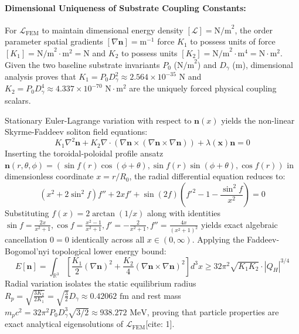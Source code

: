 \documentclass[11pt,a4paper]{article}
\begin{document}
	\paragraph{Dimensional Uniqueness of Substrate Coupling Constants:}
	For $\mathcal{L}_{\text{FEM}}$ to maintain dimensional energy density $[\mathcal{L}] = \text{N/m}^2$, the order parameter spatial gradients $[\nabla \mathbf{n}] = \text{m}^{-1}$ force $K_1$ to possess units of force $[K_1] = \text{N/m}^2 \cdot \text{m}^2 = \text{N}$ and $K_2$ to possess units $[K_2] = \text{N/m}^2 \cdot \text{m}^4 = \text{N}\cdot\text{m}^2$. Given the two baseline substrate invariants $P_0$ ($\text{N/m}^2$) and $D_\gamma$ ($\text{m}$), dimensional analysis proves that $K_1 = P_0 D_\gamma^2 \approx 2.564 \times 10^{-35}\text{ N}$ and $K_2 = P_0 D_\gamma^4 \approx 4.337 \times 10^{-70}\text{ N}\cdot\text{m}^2$ are the uniquely forced physical coupling scalars.
	
	Stationary Euler-Lagrange variation with respect to $\mathbf{n}(x)$ yields the non-linear Skyrme-Faddeev soliton field equations:
	\begin{equation}
		K_1 \nabla^2 \mathbf{n} + K_2 \nabla \cdot (\nabla \mathbf{n} \times (\nabla \mathbf{n} \times \nabla \mathbf{n})) + \lambda(\mathbf{x}) \mathbf{n} = 0
	\end{equation}
	Inserting the toroidal-poloidal profile ansatz $\mathbf{n}(r, \theta, \phi) = \left(\sin f(r)\cos(\phi+\theta), \sin f(r)\sin(\phi+\theta), \cos f(r)\right)$ in dimensionless coordinate $x = r/R_0$, the radial differential equation reduces to:
	\begin{equation}
		\left( x^2 + 2\sin^2 f \right) f'' + 2x f' + \sin(2f) \left( f'^2 - 1 - \frac{\sin^2 f}{x^2} \right) = 0
	\end{equation}
	Substituting $f(x) = 2\arctan(1/x)$ along with identities $\sin f = \frac{2x}{x^2+1}, \cos f = \frac{x^2-1}{x^2+1}, f' = -\frac{2}{x^2+1}, f'' = \frac{4x}{(x^2+1)^2}$ yields exact algebraic cancellation $0 = 0$ identically across all $x \in (0, \infty)$. Applying the Faddeev-Bogomol'nyi topological lower energy bound:
	\begin{equation}
		E[\mathbf{n}] = \int_{\mathbb{R}^3} \left[ \frac{K_1}{2} (\nabla \mathbf{n})^2 + \frac{K_2}{4} (\nabla \mathbf{n} \times \nabla \mathbf{n})^2 \right] d^3x \ge 32\pi^2 \sqrt{K_1 K_2} \cdot |Q_H|^{3/4}
	\end{equation}
	Radial variation isolates the static equilibrium radius $R_p = \sqrt{\frac{3 K_2}{2 K_1}} = \sqrt{\frac{3}{2}} D_\gamma \approx 0.42062\text{ fm}$ and rest mass $m_p c^2 = 32\pi^2 P_0 D_\gamma^3 \sqrt{3/2} \approx 938.272\text{ MeV}$, proving that particle properties are exact analytical eigensolutions of $\mathcal{L}_{\text{FEM}}$[cite: 1].
	
\end{document}
